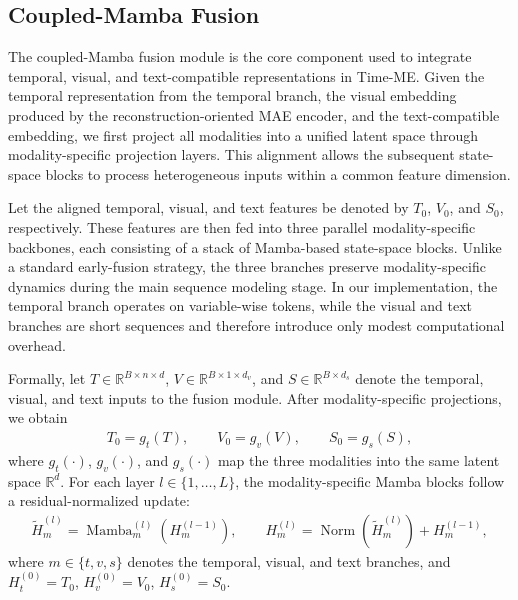 \subsection{Coupled-Mamba Fusion}

The coupled-Mamba fusion module is the core component used to integrate temporal, visual, and text-compatible representations in Time-ME. Given the temporal representation from the temporal branch, the visual embedding produced by the reconstruction-oriented MAE encoder, and the text-compatible embedding, we first project all modalities into a unified latent space through modality-specific projection layers. This alignment allows the subsequent state-space blocks to process heterogeneous inputs within a common feature dimension.

Let the aligned temporal, visual, and text features be denoted by $T_0$, $V_0$, and $S_0$, respectively. These features are then fed into three parallel modality-specific backbones, each consisting of a stack of Mamba-based state-space blocks. Unlike a standard early-fusion strategy, the three branches preserve modality-specific dynamics during the main sequence modeling stage. In our implementation, the temporal branch operates on variable-wise tokens, while the visual and text branches are short sequences and therefore introduce only modest computational overhead.

Formally, let $T \in \mathbb{R}^{B \times n \times d}$, $V \in \mathbb{R}^{B \times 1 \times d_v}$, and $S \in \mathbb{R}^{B \times d_s}$ denote the temporal, visual, and text inputs to the fusion module. After modality-specific projections, we obtain
\begin{gather}
T_0 = g_t(T), \qquad V_0 = g_v(V), \qquad S_0 = g_s(S),
\end{gather}
where $g_t(\cdot)$, $g_v(\cdot)$, and $g_s(\cdot)$ map the three modalities into the same latent space $\mathbb{R}^{d}$. For each layer $l \in \{1,\dots,L\}$, the modality-specific Mamba blocks follow a residual-normalized update:
\begin{gather}
\tilde{H}_m^{(l)} = \operatorname{Mamba}_m^{(l)}\!\left(H_m^{(l-1)}\right), \qquad
H_m^{(l)} = \operatorname{Norm}\!\left(\tilde{H}_m^{(l)}\right) + H_m^{(l-1)},
\end{gather}
where $m \in \{t,v,s\}$ denotes the temporal, visual, and text branches, and $H_t^{(0)} = T_0$, $H_v^{(0)} = V_0$, $H_s^{(0)} = S_0$.

